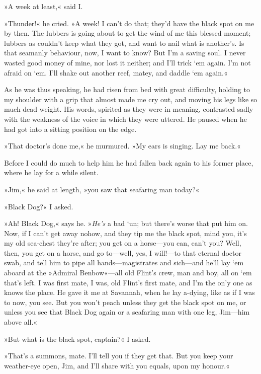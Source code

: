 »A week at least,« said I.

»Thunder!« he cried. »A week! I can't do that; they'd have the black spot on me by then. The lubbers is going about to get the wind of me this blessed moment; lubbers as couldn't keep what they got, and want to nail what is another's. Is that seamanly behaviour, now, I want to know? But I'm a saving soul. I never wasted good money of mine, nor lost it neither; and I'll trick `em again. I'm not afraid on `em. I'll shake out another reef, matey, and daddle `em again.«

As he was thus speaking, he had risen from bed with great difficulty, holding to my shoulder with a grip that almost made me cry out, and moving his legs like so much dead weight. His words, spirited as they were in meaning, contrasted sadly with the weakness of the voice in which they were uttered. He paused when he had got into a sitting position on the edge.

»That doctor's done me,« he murmured. »My ears is singing. Lay me back.«

Before I could do much to help him he had fallen back again to his former place, where he lay for a while silent.

»Jim,« he said at length, »you saw that seafaring man today?«

»Black Dog?« I asked.

»Ah! Black Dog,« says he. »\textit{He's} a bad `un; but there's worse that put him on. Now, if I can't get away nohow, and they tip me the black spot, mind you, it's my old sea-chest they're after; you get on a horse—you can, can't you? Well, then, you get on a horse, and go to—well, yes, I will!—to that eternal doctor swab, and tell him to pipe all hands—magistrates and sich—and he'll lay `em aboard at the »Admiral Benbow«—all old Flint's crew, man and boy, all on `em that's left. I was first mate, I was, old Flint's first mate, and I'm the on'y one as knows the place. He gave it me at Savannah, when he lay a-dying, like as if I was to now, you see. But you won't peach unless they get the black spot on me, or unless you see that Black Dog again or a seafaring man with one leg, Jim—him above all.«

»But what is the black spot, captain?« I asked.

»That's a summons, mate. I'll tell you if they get that. But you keep your weather-eye open, Jim, and I'll share with you equals, upon my honour.«

